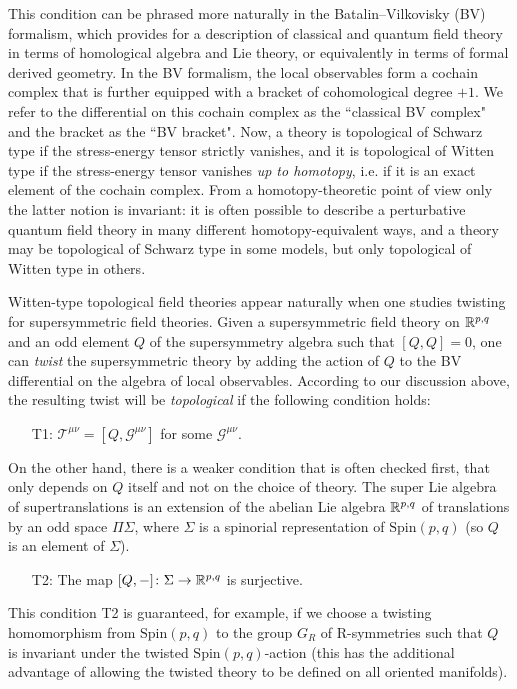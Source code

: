 \documentclass[11pt, oneside, reqno]{amsart}
\theoremstyle{definition} \newtheorem{definition}{Definition}[section]
\theoremstyle{definition}
\theoremstyle{remark}
\theoremstyle{definition} \newtheorem{remark}[definition]{Remark}
\theoremstyle{definition} \newtheorem{remarks}[definition]{Remarks}
\theoremstyle{definition} \newtheorem{question}[definition]{Question}
\theoremstyle{definition} \newtheorem*{note}{Note}
\theoremstyle{definition} \newtheorem{example}[definition]{Example}
\theoremstyle{definition} \newtheorem{examples}[definition]{Examples}
\newcommand{\spin}{\mathrm{Spin}}
\newcommand{\mc}[1]{\mathcal{#1}}
\begin{document}
This condition can be phrased more naturally in the Batalin--Vilkovisky (BV) formalism, which provides for a description of classical and quantum field theory in terms of homological algebra and Lie theory, or equivalently in terms of formal derived geometry.  In the BV formalism, the local observables form a cochain complex that is further equipped with a bracket of cohomological degree $+1$.  
We refer to the differential on this cochain complex as the ``classical BV complex" and the bracket as the ``BV bracket". 
Now, a theory is topological of Schwarz type if the stress-energy tensor strictly vanishes, and it is topological of Witten type if the stress-energy tensor vanishes \emph{up to homotopy}, i.e. if it is an exact element of the cochain complex.  From a homotopy-theoretic point of view only the latter notion is invariant: it is often possible to describe a perturbative quantum field theory in many different homotopy-equivalent ways, and a theory may be topological of Schwarz type in some models, but only topological of Witten type in others.

Witten-type topological field theories appear naturally when one studies twisting for supersymmetric field theories.  Given a supersymmetric field theory on $\mathbb R^{p,q}$ and an odd element $Q$ of the supersymmetry algebra such that $[Q,Q]=0$, one can \emph{twist} the supersymmetric theory by adding the action of $Q$ to the BV differential on the algebra of local observables.  According to our discussion above, the resulting twist will be \emph{topological} if the following condition holds:
\begin{itemize}
 \item[T1:] $\mc T^{\mu \nu} = [Q, \mc G^{\mu \nu}]$ for some $\mc G^{\mu \nu}$.
\end{itemize}
On the other hand, there is a weaker condition that is often checked first, that only depends on $Q$ itself and not on the choice of theory.  
The super Lie algebra of supertranslations is an extension of the abelian Lie algebra $\mathbb R^{p,q}$ of translations by an odd space $\Pi \Sigma$, where $\Sigma$ is a spinorial representation of $\spin(p,q)$ (so $Q$ is an element of $\Sigma$).
\begin{itemize}
 \item[T2:] The map $[Q, -] \colon \Sigma \to \mathbb R^{p,q}$ is surjective.
\end{itemize}
This condition T2 is guaranteed, for example, if we choose a twisting homomorphism from $\spin(p,q)$ to the group $G_R$ of R-symmetries such that $Q$ is invariant under the twisted $\spin(p,q)$-action (this has the additional advantage of allowing the twisted theory to be defined on all oriented manifolds).  
\end{document}

